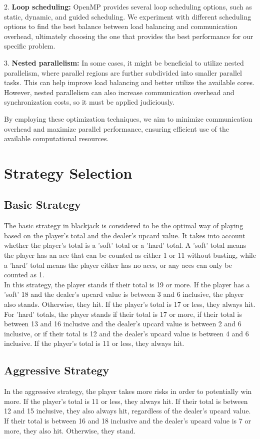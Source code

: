 \documentclass[twocolumn]{report}
\begin{document}
2. \textbf{Loop scheduling:} OpenMP provides several loop scheduling options, such as static, dynamic, and guided scheduling. We experiment with different scheduling options to find the best balance between load balancing and communication overhead, ultimately choosing the one that provides the best performance for our specific problem.

3. \textbf{Nested parallelism:} In some cases, it might be beneficial to utilize nested parallelism, where parallel regions are further subdivided into smaller parallel tasks. This can help improve load balancing and better utilize the available cores. However, nested parallelism can also increase communication overhead and synchronization costs, so it must be applied judiciously.

By employing these optimization techniques, we aim to minimize communication overhead and maximize parallel performance, ensuring efficient use of the available computational resources.


\newpage
\section{Strategy Selection}

\subsection{Basic Strategy}
The basic strategy in blackjack is considered to be the optimal way of playing based on the player's total and the dealer's upcard value. It takes into account whether the player's total is a 'soft' total or a 'hard' total. A 'soft' total means the player has an ace that can be counted as either 1 or 11 without busting, while a 'hard' total means the player either has no aces, or any aces can only be counted as 1.\\

In this strategy, the player stands if their total is 19 or more. If the player has a 'soft' 18 and the dealer's upcard value is between 3 and 6 inclusive, the player also stands. Otherwise, they hit. If the player's total is 17 or less, they always hit. For 'hard' totals, the player stands if their total is 17 or more, if their total is between 13 and 16 inclusive and the dealer's upcard value is between 2 and 6 inclusive, or if their total is 12 and the dealer's upcard value is between 4 and 6 inclusive. If the player's total is 11 or less, they always hit.

\subsection{Aggressive Strategy}
In the aggressive strategy, the player takes more risks in order to potentially win more. If the player's total is 11 or less, they always hit. If their total is between 12 and 15 inclusive, they also always hit, regardless of the dealer's upcard value. If their total is between 16 and 18 inclusive and the dealer's upcard value is 7 or more, they also hit. Otherwise, they stand.
\end{document}
